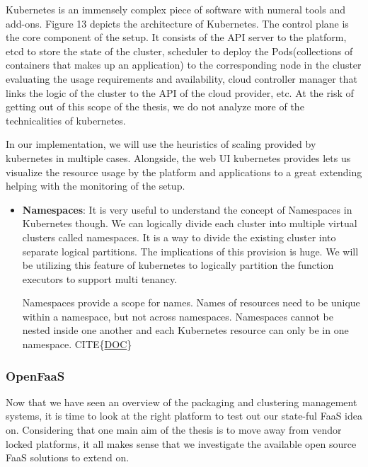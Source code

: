 \documentclass[12pt,titlepage]{article}
\begin{document}
Kubernetes is an immensely complex piece of software with numeral tools and
add-ons. Figure 13 depicts the architecture of Kubernetes. The control plane is
the core component of the setup. It consists of the API server to the platform,
etcd to store the state of the cluster, scheduler to deploy the Pods(collections
of containers that makes up an application) to the corresponding node in the
cluster evaluating the usage requirements and availability, cloud controller
manager that links the logic of the cluster to the API of the cloud provider,
etc. At the risk of getting out of this scope of the thesis, we do not analyze
more of the technicalities of kubernetes.

In our implementation, we will use the heuristics of scaling provided by
kubernetes in multiple cases. Alongside, the web UI kubernetes provides lets us
visualize the resource usage by the platform and applications to a great
extending helping with the monitoring of the setup.

\begin{itemize}
\item \textbf{Namespaces}: It is very useful to understand the concept of Namespaces in Kubernetes though.
We can logically divide each cluster into multiple virtual clusters called
namespaces. It is a way to divide the existing cluster into separate logical
partitions. The implications of this provision is huge. We will be utilizing
this feature of kubernetes to logically partition the function executors to
support multi tenancy. 

Namespaces provide a scope for names. Names of resources need to be unique
within a namespace, but not across namespaces. Namespaces cannot be nested
inside one another and each Kubernetes resource can only be in one namespace. CITE\{\href{https://kubernetes.io/docs/concepts/overview/working-with-objects/namespaces/}{DOC}\}
\end{itemize}


\subsubsection{OpenFaaS}
\label{sec:orgf6e9118}
Now that we have seen an overview of the packaging and clustering management
systems, it is time to look at the right platform to test out our state-ful FaaS
idea on. Considering that one main aim of the thesis is to move away from vendor
locked platforms, it all makes sense that we investigate the available open
source FaaS solutions to extend on.
\end{document}
